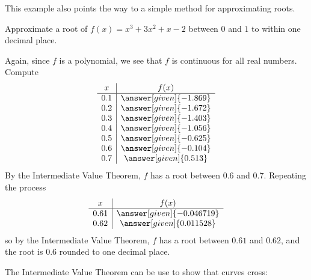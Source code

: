 \documentclass{ximera}
\begin{document}
This example also points the way to a simple method for approximating
roots. 



\begin{problem} 
Approximate a root of $f(x) =x^3 + 3x^2+x-2$ between $0$ and $1$ to
within one decimal place.

\begin{explanation} 
Again, since $f$ is a polynomial, we see that $f$ is continuous for
all real numbers. Compute
\[
\begin{array}{c|c}
  x   & f(x) \\ \hline
  0.1 & \answer[given]{-1.869}\\
  0.2 & \answer[given]{-1.672}\\
  0.3 & \answer[given]{-1.403}\\
  0.4 & \answer[given]{-1.056}\\
  0.5 & \answer[given]{-0.625}\\
  0.6 & \answer[given]{-0.104}\\
  0.7 & \answer[given]{0.513}
\end{array}
\]
By the Intermediate Value Theorem, $f$ has a root between $0.6$ and
$0.7$. Repeating the process
\[
\begin{array}{c|c}
  x   & f(x) \\ \hline
  0.61 & \answer[given]{-0.046719}\\
  0.62 & \answer[given]{0.011528}
\end{array}
\]
so by the Intermediate Value Theorem, $f$ has a root between $0.61$
and $0.62$, and the root is $0.6$ rounded to one decimal place.
\end{explanation}
\end{problem}


The Intermediate Value Theorem can be use to show that curves cross:
\end{document}
